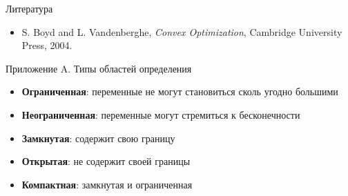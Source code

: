 \documentclass{beamer}
\begin{document}
\begin{frame}{Литература}
	\begin{itemize}
		\item S. Boyd and L. Vandenberghe, \textit{Convex Optimization}, Cambridge University Press, 2004. 
	\end{itemize}
\end{frame}


\myqrframe

\begin{frame}{Приложение A. Типы областей определения}
	\begin{itemize}
		\item \textbf{Ограниченная}: переменные не могут становиться сколь угодно большими
		\item \textbf{Неограниченная}: переменные могут стремиться к бесконечности
		\item \textbf{Замкнутая}: содержит свою границу
		\item \textbf{Открытая}: не содержит своей границы
		\item \textbf{Компактная}: замкнутая и ограниченная
	\end{itemize}
\end{frame}
\end{document}
